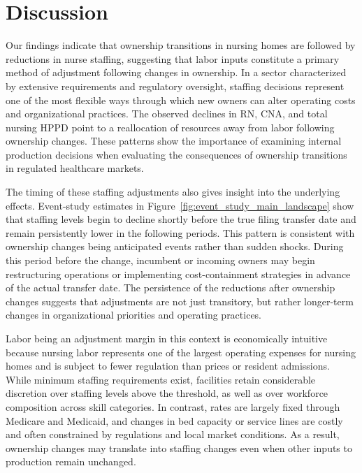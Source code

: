 \documentclass[preprint,authoryear]{elsarticle}
\begin{document}
\section{Discussion}

Our findings indicate that ownership transitions in nursing homes are followed by reductions in nurse staffing, suggesting that labor inputs constitute a primary method of adjustment following changes in ownership. In a sector characterized by extensive requirements and regulatory oversight, staffing decisions represent one of the most flexible ways through which new owners can alter operating costs and organizational practices. The observed declines in RN, CNA, and total nursing HPPD point to a reallocation of resources away from labor following ownership changes. These patterns show the importance of examining internal production decisions when evaluating the consequences of ownership transitions in regulated healthcare markets.

The timing of these staffing adjustments also gives insight into the underlying effects. Event-study estimates in Figure~\ref{fig:event_study_main_landscape} show that staffing levels begin to decline shortly before the true filing transfer date and remain persistently lower in the following periods. This pattern is consistent with ownership changes being anticipated events rather than sudden shocks. During this period before the change, incumbent or incoming owners may begin restructuring operations or implementing cost-containment strategies in advance of the actual transfer date. The persistence of the reductions after ownership changes suggests that adjustments are not just transitory, but rather longer-term changes in organizational priorities and operating practices.

Labor being an adjustment margin in this context is economically intuitive because nursing labor represents one of the largest operating expenses for nursing homes and is subject to fewer regulation than prices or resident admissions. While minimum staffing requirements exist, facilities retain considerable discretion over staffing levels above the threshold, as well as over workforce composition across skill categories. In contrast, rates are largely fixed through Medicare and Medicaid, and changes in bed capacity or service lines are costly and often constrained by regulations and local market conditions. As a result, ownership changes may translate into staffing changes even when other inputs to production remain unchanged.
\end{document}

